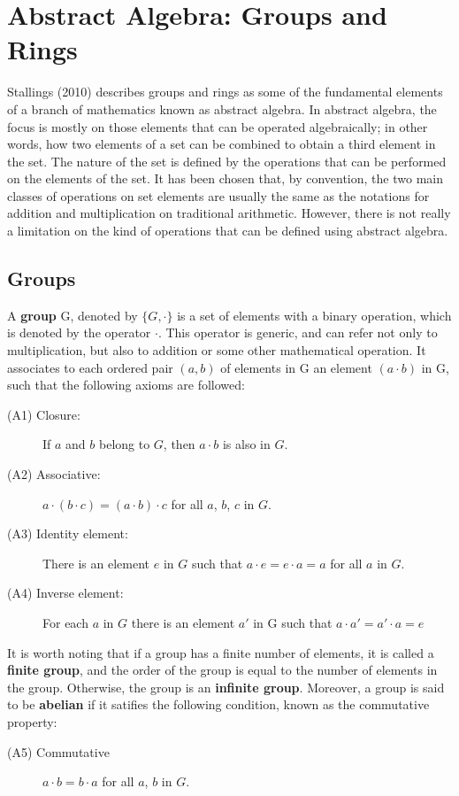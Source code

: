 \section{Abstract Algebra: Groups and Rings}

Stallings (2010) \cite{CryptoStallings} describes groups and rings as some of the fundamental elements of a branch of mathematics known as abstract algebra. In abstract algebra, the focus is mostly on those elements that can be operated algebraically; in other words, how two elements of a set can be combined to obtain a third element in the set. The nature of the set is defined by the operations that can be performed on the elements of the set. It has been chosen that, by convention, the two main classes of operations on set elements are usually the same as the notations for addition and multiplication on traditional arithmetic. However, there is not really a limitation on the kind of operations that can be defined using abstract algebra.

\subsection{Groups}

A \textbf{group} G, denoted by $\{ G, \cdot \}$ is a set of elements with a binary operation, which is denoted by the operator $\cdot$. This operator is generic, and can refer not only to multiplication, but also to addition or some other mathematical operation. It associates to each ordered pair $(a, b)$ of elements in G an element $(a \cdot b)$ in G, such that the following axioms are followed:
\begin{description}
  \item[(A1) Closure:] If $a$ and $b$ belong to $G$, then $a \cdot b$ is also in $G$.
  \item[(A2) Associative:] $a \cdot (b \cdot c) = (a \cdot b) \cdot c $ for all $a$, $b$, $c$ in $G$.
  \item[(A3) Identity element:] There is an element $e$ in $G$ such that $a \cdot e = e \cdot a = a$ for all $a$ in $G$.
  \item[(A4) Inverse element:] For each $a$ in $G$ there is an element $a'$ in G such that $a \cdot a' = a' \cdot a = e$ 
\end{description}
It is worth noting that if a group has a finite number of elements, it is called a \textbf{finite group}, and the order of the group is equal to the number of elements in the group. Otherwise, the group is an \textbf{infinite group}. Moreover, a group is said to be \textbf{abelian} if it satifies the following condition, known as the commutative property:
\begin{description}
  \item[(A5) Commutative] $a \cdot b = b \cdot a$ for all $a$, $b$ in $G$.
\end{description}

